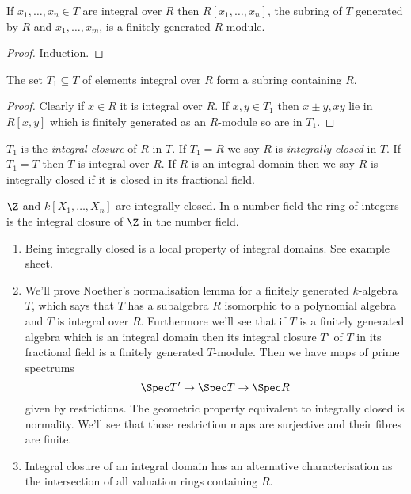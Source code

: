 \documentclass[a4paper]{article}
\begin{document}
\begin{lemma}
  If \(x_1, \dots, x_n \in T\) are integral over \(R\) then \(R[x_1, \dots, x_n]\), the subring of \(T\) generated by \(R\) and \(x_1, \dots, x_m\), is a finitely generated \(R\)-module.
\end{lemma}

\begin{proof}
  Induction.
\end{proof}

\begin{lemma}
  The set \(T_1 \subseteq T\) of elements integral over \(R\) form a subring containing \(R\).
\end{lemma}

\begin{proof}
  Clearly if \(x \in R\) it is integral over \(R\). If \(x, y \in T_1\) then \(x \pm y, xy\) lie in \(R[x, y]\) which is finitely generated as an \(R\)-module so are in \(T_1\).
\end{proof}

\begin{definition}
  \(T_1\) is the \emph{integral closure} of \(R\) in \(T\). If \(T_1 = R\) we say \(R\) is \emph{integrally closed} in \(T\). If \(T_1 = T\) then \(T\) is integral over \(R\). If \(R\) is an integral domain then we say \(R\) is integrally closed if it is closed in its fractional field.
\end{definition}

\begin{eg}
  \(\Z\) and \(k[X_1, \dots, X_n]\) are integrally closed. In a number field the ring of integers is the integral closure of \(\Z\) in the number field.
\end{eg}

\begin{remark}\leavevmode
  \begin{enumerate}
  \item Being integrally closed is a local property of integral domains. See example sheet.
  \item We'll prove Noether's normalisation lemma for a finitely generated \(k\)-algebra \(T\), which says that \(T\) has a subalgebra \(R\) isomorphic to a polynomial algebra and \(T\) is integral over \(R\). Furthermore we'll see that if \(T\) is a finitely generated algebra which is an integral domain then its integral closure \(T'\) of \(T\) in its fractional field is a finitely generated \(T\)-module. Then we have maps of prime spectrums
    \[
      \Spec T' \to \Spec T \to \Spec R
    \]
    given by restrictions. The geometric property equivalent to integrally closed is normality. We'll see that those restriction maps are surjective and their fibres are finite.
  \item Integral closure of an integral domain has an alternative characterisation as the intersection of all valuation rings containing \(R\).
  \end{enumerate}
\end{remark}
\end{document}
